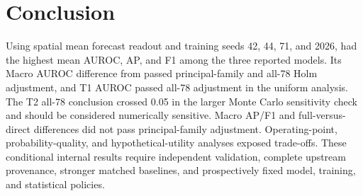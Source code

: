 \section{Conclusion}
Using spatial mean forecast readout and training seeds 42, 44, 71, and 2026, \fullmodel{} had the highest mean AUROC, AP, and F1 among the three reported models. Its Macro AUROC difference from \nojepa{} passed principal-family and all-78 Holm adjustment, and T1 AUROC passed all-78 adjustment in the uniform analysis. The T2 all-78 conclusion crossed 0.05 in the larger Monte Carlo sensitivity check and should be considered numerically sensitive. Macro AP/F1 and full-versus-direct differences did not pass principal-family adjustment. Operating-point, probability-quality, and hypothetical-utility analyses exposed trade-offs. These conditional internal results require independent validation, complete upstream provenance, stronger matched baselines, and prospectively fixed model, training, and statistical policies.
